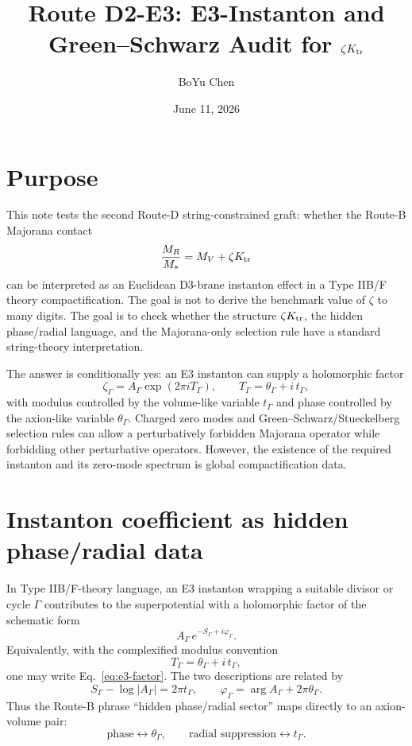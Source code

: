 \documentclass[11pt]{article}
\title{Route D2-E3: E3-Instanton and Green--Schwarz Audit for \(\zeta K_{\rm tr}\)}
\author{BoYu Chen}
\date{June 11, 2026}
\begin{document}
\maketitle

\section*{Purpose}

This note tests the second Route-D string-constrained graft: whether the
Route-B Majorana contact
\begin{equation}
  \frac{M_R}{M_*}=M_V+\zeta K_{\rm tr}
\end{equation}
can be interpreted as an Euclidean D3-brane instanton effect in a Type IIB/F
theory compactification.  The goal is not to derive the benchmark value of
\(\zeta\) to many digits.  The goal is to check whether the structure
\(\zeta K_{\rm tr}\), the hidden phase/radial language, and the
Majorana-only selection rule have a standard string-theory interpretation.

The answer is conditionally yes: an E3 instanton can supply a holomorphic
factor
\begin{equation}
  \zeta_\Gamma=A_\Gamma \exp(2\pi i T_\Gamma),
  \qquad
  T_\Gamma=\theta_\Gamma+i\,t_\Gamma,
  \label{eq:e3-factor}
\end{equation}
with modulus controlled by the volume-like variable \(t_\Gamma\) and phase
controlled by the axion-like variable \(\theta_\Gamma\).  Charged zero modes
and Green--Schwarz/Stueckelberg selection rules can allow a perturbatively
forbidden Majorana operator while forbidding other perturbative operators.
However, the existence of the required instanton and its zero-mode spectrum is
global compactification data.

\section{Instanton coefficient as hidden phase/radial data}

In Type IIB/F-theory language, an E3 instanton wrapping a suitable divisor or
cycle \(\Gamma\) contributes to the superpotential with a holomorphic factor
of the schematic form
\begin{equation}
  A_\Gamma\,e^{-S_\Gamma+i\varphi_\Gamma}.
\end{equation}
Equivalently, with the complexified modulus convention
\begin{equation}
  T_\Gamma=\theta_\Gamma+i\,t_\Gamma,
\end{equation}
one may write Eq.~\eqref{eq:e3-factor}.  The two descriptions are related by
\begin{equation}
  S_\Gamma-\log|A_\Gamma|=2\pi t_\Gamma,\qquad
  \varphi_\Gamma=\arg A_\Gamma+2\pi\theta_\Gamma .
\end{equation}
Thus the Route-B phrase ``hidden phase/radial sector'' maps directly to an
axion-volume pair:
\begin{equation}
  \text{phase}\leftrightarrow \theta_\Gamma,\qquad
  \text{radial suppression}\leftrightarrow t_\Gamma.
\end{equation}
\end{document}
